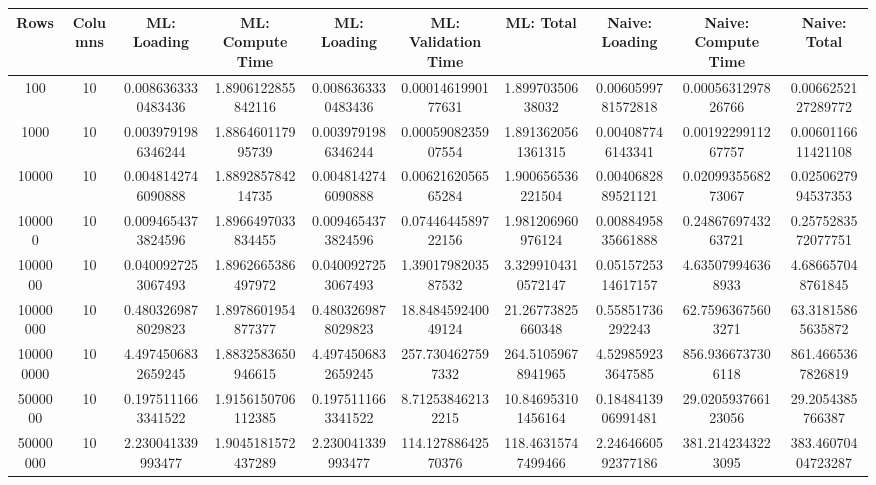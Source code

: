 \begin{table}[htb]
    \centering
    \begin{tabular}{@{}cccccccccc@{}}
        \toprule
        Rows & Columns & ML: Loading & ML: Compute Time & ML: Loading & ML: Validation Time & ML: Total & Naive: Loading & Naive: Compute Time & Naive: Total \\
        \midrule
        100 & 10 & 0.0086363330483436 & 1.8906122855842116 & 0.0086363330483436 & 0.0001461990177631 & 1.89970350638032 & 0.0060599781572818 & 0.0005631297826766 & 0.0066252127289772 \\
        1000 & 10 & 0.0039791986346244 & 1.886460117995739 & 0.0039791986346244 & 0.0005908235907554 & 1.8913620561361315 & 0.004087746143341 & 0.0019229911267757 & 0.0060116611421108 \\
        10000 & 10 & 0.0048142746090888 & 1.889285784214735 & 0.0048142746090888 & 0.0062162056565284 & 1.900656536221504 & 0.0040682889521121 & 0.0209935568273067 & 0.0250627994537353 \\
        100000 & 10 & 0.0094654373824596 & 1.8966497033834455 & 0.0094654373824596 & 0.0744644589722156 & 1.981206960976124 & 0.0088495835661888 & 0.2486769743263721 & 0.2575283572077751 \\
        1000000 & 10 & 0.0400927253067493 & 1.8962665386497972 & 0.0400927253067493 & 1.3901798203587532 & 3.3299104310572147 & 0.0515725314617157 & 4.635079946368933 & 4.686657048761845 \\
        10000000 & 10 & 0.4803269878029823 & 1.8978601954877377 & 0.4803269878029823 & 18.848459240049124 & 21.26773825660348 & 0.55851736292243 & 62.75963675603271 & 63.31815865635872 \\
        100000000 & 10 & 4.4974506832659245 & 1.8832583650946615 & 4.4974506832659245 & 257.7304627597332 & 264.51059678941965 & 4.529859233647585 & 856.9366737306118 & 861.4665367826819 \\
        5000000 & 10 & 0.1975111663341522 & 1.9156150706112385 & 0.1975111663341522 & 8.712538462132215 & 10.846953101456164 & 0.1848413906991481 & 29.020593766123056 & 29.2054385766387 \\
        50000000 & 10 & 2.230041339993477 & 1.9045181572437289 & 2.230041339993477 & 114.12788642570376 & 118.46315747499466 & 2.2464660592377186 & 381.2142343223095 & 383.46070404723287 \\
        \bottomrule
    \end{tabular}
\end{table}